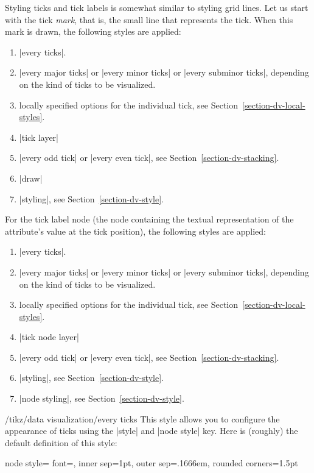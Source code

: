 Styling ticks and tick labels is somewhat similar to styling grid lines. Let us start with the tick \emph{mark}, that is, the small line that represents the tick. When this mark is drawn, the following styles are applied:
%
\begin{enumerate}
    \item |every ticks|.
    \item |every major ticks| or |every minor ticks| or |every subminor ticks|, depending on the kind of ticks to be visualized.
    \item locally specified options for the individual tick, see Section~\ref{section-dv-local-styles}.
    \item |tick layer|
    \item |every odd tick| or |every even tick|, see Section~\ref{section-dv-stacking}.
    \item |draw|
    \item |styling|, see Section~\ref{section-dv-style}.
\end{enumerate}

For the tick label node (the node containing the textual representation of the attribute's value at the tick position), the following styles are applied:
%
\begin{enumerate}
    \item |every ticks|.
    \item |every major ticks| or |every minor ticks| or |every subminor ticks|, depending on the kind of ticks to be visualized.
    \item locally specified options for the individual tick, see Section~\ref{section-dv-local-styles}.
    \item |tick node layer|
    \item |every odd tick| or |every even tick|, see Section~\ref{section-dv-stacking}.
    \item |styling|, see Section~\ref{section-dv-style}.
    \item |node styling|, see Section~\ref{section-dv-style}.
\end{enumerate}

\begin{stylekey}{/tikz/data visualization/every ticks}
    This style allows you to configure the appearance of ticks using the |style| and |node style| key. Here is (roughly) the default definition of
    this style:
\begin{codeexample}
node style={
  font=\footnotesize,
  inner sep=1pt,
  outer sep=.1666em,
  rounded corners=1.5pt
}
\end{codeexample}
\end{stylekey}


